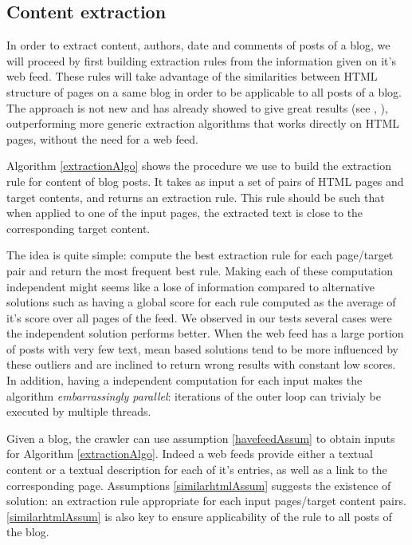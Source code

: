 \subsection{Content extraction}
In order to extract content, authors, date and comments of posts of a blog, we will proceed by first building extraction rules from the information given on it's web feed. These rules will take advantage of the similarities between HTML structure of pages on a same blog in order to be applicable to all posts of a blog. The approach is not new and has already showed to give great results (see \cite{gkotsis2013}, \cite{oita2010}), outperforming more generic extraction algorithms that works directly on HTML pages, without the need for a web feed.

\extractionAlgo

Algorithm \ref{extractionAlgo} shows the procedure we use to build the extraction rule for content of blog posts. It takes as input a set of pairs of HTML pages and target contents, and returns an extraction rule. This rule should be such that when applied to one of the input pages, the extracted text is close to the corresponding target content.

The idea is quite simple: compute the best extraction rule for each page/target pair and return the most frequent best rule. Making each of these computation independent might seems like a lose of information compared to alternative solutions such as having a global score for each rule computed as the average of it's score over all pages of the feed. We observed in our tests several cases were the independent solution performs better. When the web feed has a large portion of posts with very few text, mean based solutions tend to be more influenced by these outliers and are inclined to return wrong results with constant low scores. In addition, having a independent computation for each input makes the algorithm \emph{embarrassingly parallel}: iterations of the outer loop can trivialy be executed by multiple threads.

Given a blog, the crawler can use assumption \ref{havefeedAssum} to obtain inputs for Algorithm \ref{extractionAlgo}. Indeed a web feeds provide either a textual content or a textual description for each of it's entries, as well as a link to the corresponding page. Assumptions \ref{similarhtmlAssum} suggests the existence of solution: an extraction rule appropriate for each input pages/target content pairs. \ref{similarhtmlAssum} is also key to ensure applicability of the rule to all posts of the blog.

